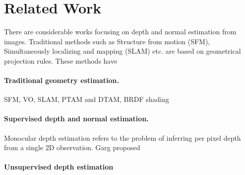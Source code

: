 \section{Related Work}

There are considerable works focusing on depth and normal estimation from images. Traditional methods such as Structure from motion (SFM), Simultaneously localizing and mapping (SLAM) etc. are based on geometrical projection rules. These methods have 

\paragraph{Traditional geometry estimation.} SFM, VO, SLAM, PTAM and DTAM,  BRDF shading

\paragraph{Supervised depth and normal estimation.}
Monocular depth estimation refers to the problem of inferring per pixel depth from a single 2D observation. Garg \etal \cite{} proposed 

\paragraph{Unsupervised depth estimation }
